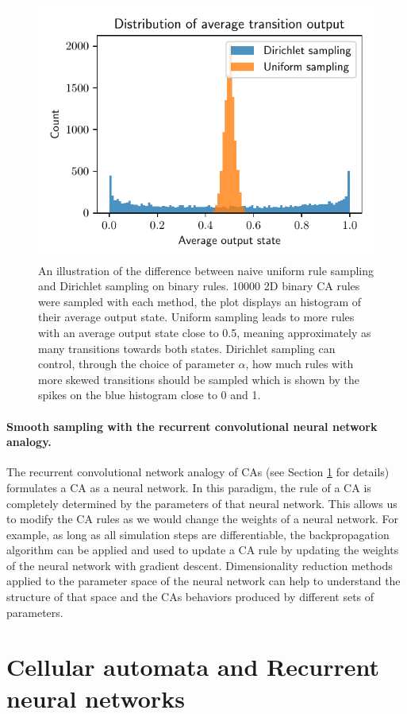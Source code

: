 \begin{figure}[htbp]
  \centering
  \includegraphics[width=.5\linewidth]{figures/ca_rule_sampling_hist}
  \caption{An illustration of the difference between naive uniform rule sampling
    and Dirichlet sampling on binary rules. 10000 2D binary CA rules were
    sampled with each method, the plot displays an histogram of their average
    output state. Uniform sampling leads to more rules with an average output
    state close to 0.5, meaning approximately as many transitions towards both
    states. Dirichlet sampling can control, through the choice of parameter $\alpha$,
    how much rules with more skewed transitions should be sampled which is
   shown by the spikes on the blue histogram close to 0 and 1.}
  \label{fig:ca_rule_sampling}
\end{figure}

\paragraph{Smooth sampling with the recurrent convolutional neural network
  analogy.}

The recurrent convolutional network analogy of \acp{CA} (see Section
\ref{sec:cell-autom-rnns} for details) formulates a \ac{CA} as a neural network.
In this paradigm, the rule of a \ac{CA} is completely determined by the parameters
of that neural network. This allows us to modify the \ac{CA} rules as we would
change the weights of a neural network. For example, as long as all simulation
steps are differentiable, the backpropagation algorithm can be applied and used
to update a \ac{CA} rule by updating the weights of the neural network with
gradient descent. Dimensionality reduction methods applied to the parameter
space of the neural network can help to understand the structure of that space and
the \acp{CA} behaviors produced by different sets of parameters.


\section{Cellular automata and Recurrent neural networks}\label{sec:cell-autom-rnns}

